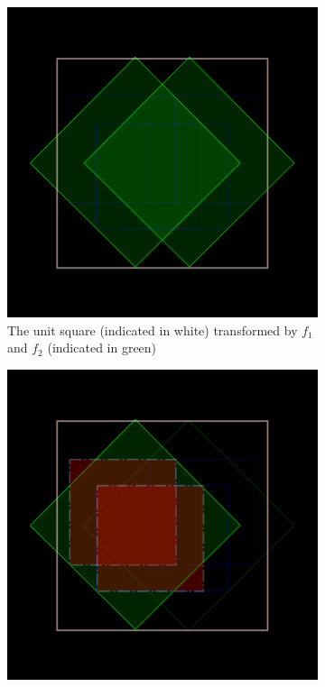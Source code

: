 \documentclass[11pt]{article}
\begin{document}
\begin{enumerate}
\begin{figure}
     \centering
     \begin{subfigure}[b]{0.4\textwidth}
         \centering
         \includegraphics[width=\textwidth]{figures/dragon_curve_a}
         \caption{The unit square (indicated in white) transformed by $f_1$ and $f_2$ (indicated in green)}
         \label{figure:dragon_curve_a}
     \end{subfigure}
     \hfill
     \begin{subfigure}[b]{0.4\textwidth}
         \centering
         \includegraphics[width=\textwidth]{figures/dragon_curve_b}

\end{subfigure}
\end{figure}
\end{enumerate}
\end{document}
